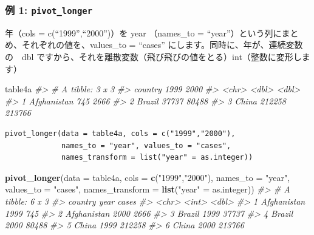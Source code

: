 \documentclass[
  xelatex, ja=standard]{bxjsbook}
\newenvironment{Shaded}{\begin{snugshade}}{\end{snugshade}}
\newcommand{\AttributeTok}[1]{\textcolor[rgb]{0.13,0.29,0.53}{#1}}
\newcommand{\CommentTok}[1]{\textcolor[rgb]{0.56,0.35,0.01}{\textit{#1}}}
\newcommand{\FunctionTok}[1]{\textcolor[rgb]{0.13,0.29,0.53}{\textbf{#1}}}
\newcommand{\NormalTok}[1]{#1}
\newcommand{\OtherTok}[1]{\textcolor[rgb]{0.56,0.35,0.01}{#1}}
\newcommand{\StringTok}[1]{\textcolor[rgb]{0.31,0.60,0.02}{#1}}
\theoremstyle{definition}
\theoremstyle{definition}
\theoremstyle{definition}
\theoremstyle{definition}
\theoremstyle{remark}
\begin{document}
\hypertarget{ux4f8b-1-pivot_longer}{%
\subsubsection{\texorpdfstring{例 1: \texttt{pivot\_longer}}{例 1: pivot\_longer}}\label{ux4f8b-1-pivot_longer}}

年（cols = c(``1999'',``2000'')）を year （names\_to = ``year''）という列にまとめ、それぞれの値を、values\_to = ``cases'' にします。同時に、年が、連続変数の　dbl ですから、それを離散変数（飛び飛びの値をとる）int（整数に変形します）

\begin{Shaded}
\begin{Highlighting}[]
\NormalTok{table4a}
\CommentTok{\#\textgreater{} \# A tibble: 3 x 3}
\CommentTok{\#\textgreater{}   country     \textasciigrave{}1999\textasciigrave{} \textasciigrave{}2000\textasciigrave{}}
\CommentTok{\#\textgreater{}   \textless{}chr\textgreater{}        \textless{}dbl\textgreater{}  \textless{}dbl\textgreater{}}
\CommentTok{\#\textgreater{} 1 Afghanistan    745   2666}
\CommentTok{\#\textgreater{} 2 Brazil       37737  80488}
\CommentTok{\#\textgreater{} 3 China       212258 213766}
\end{Highlighting}
\end{Shaded}

\begin{verbatim}
pivot_longer(data = table4a, cols = c("1999","2000"), 
             names_to = "year", values_to = "cases",
             names_transform = list("year" = as.integer))
\end{verbatim}

\begin{Shaded}
\begin{Highlighting}[]
\FunctionTok{pivot\_longer}\NormalTok{(}\AttributeTok{data =}\NormalTok{ table4a, }\AttributeTok{cols =} \FunctionTok{c}\NormalTok{(}\StringTok{"1999"}\NormalTok{,}\StringTok{"2000"}\NormalTok{), }
             \AttributeTok{names\_to =} \StringTok{"year"}\NormalTok{, }\AttributeTok{values\_to =} \StringTok{"cases"}\NormalTok{, }
             \AttributeTok{names\_transform =} \FunctionTok{list}\NormalTok{(}\StringTok{"year"} \OtherTok{=}\NormalTok{ as.integer))}
\CommentTok{\#\textgreater{} \# A tibble: 6 x 3}
\CommentTok{\#\textgreater{}   country      year  cases}
\CommentTok{\#\textgreater{}   \textless{}chr\textgreater{}       \textless{}int\textgreater{}  \textless{}dbl\textgreater{}}
\CommentTok{\#\textgreater{} 1 Afghanistan  1999    745}
\CommentTok{\#\textgreater{} 2 Afghanistan  2000   2666}
\CommentTok{\#\textgreater{} 3 Brazil       1999  37737}
\CommentTok{\#\textgreater{} 4 Brazil       2000  80488}
\CommentTok{\#\textgreater{} 5 China        1999 212258}
\CommentTok{\#\textgreater{} 6 China        2000 213766}
\end{Highlighting}
\end{Shaded}
\end{document}
